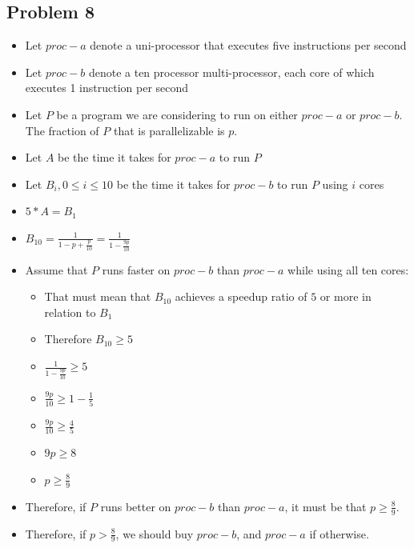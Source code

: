 \documentclass[]{article}
\begin{document}
\subsection{Problem 8}
\begin{itemize}
	\item Let $proc-a$ denote a uni-processor that executes five instructions per second
	\item Let $proc-b$ denote a ten processor multi-processor, each core of which executes 1 instruction per second
	\item Let $P$ be a program we are considering to run on either $proc-a$ or $proc-b$. The fraction of $P$ that is parallelizable is $p$.
	\item Let $A$ be the time it takes for $proc-a$ to run $P$
	\item Let $B_i, 0 \leq i \leq 10$ be the time it takes for $proc-b$ to run $P$ using $i$ cores
	\item $5 * A = B_1$
	\item $B_{10} = \frac{1}{1 - p + \frac{p}{10}} = \frac{1}{1 - \frac{9p}{10}}$
	\item Assume that $P$ runs faster on $proc-b$ than $proc-a$ while using all ten cores:
	\begin{itemize}
		\item That must mean that $B_{10}$ achieves a speedup ratio of $5$ or more in relation to $B_1$
		\item Therefore $B_{10} \geq 5$
		\item $\frac{1}{1 - \frac{9p}{10}} \geq 5$
		\item $\frac{9p}{10} \geq 1 - \frac{1}{5}$
		\item $\frac{9p}{10} \geq \frac{4}{5}$
		\item $9p \geq 8$
		\item $p \geq \frac{8}{9}$
	\end{itemize}
	\item Therefore, if $P$ runs better on $proc-b$ than $proc-a$, it must be that  $p \geq \frac{8}{9}$. 
	\item Therefore, if $p > \frac{8}{9}$, we should buy $proc-b$, and $proc-a$ if otherwise.
\end{itemize}
\end{document}
